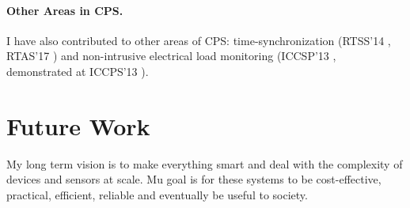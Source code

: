\documentclass[10pt]{article}
\begin{document}
\paragraph{Other Areas in CPS. }
I have also contributed to other areas of CPS:
time-synchronization (RTSS'14 \cite{buevich2013hardware}, RTAS'17 \cite{dongare2017pulsar}) and non-intrusive electrical load
monitoring (ICCSP'13 \cite{rajagopal2013magnetic}, demonstrated at ICCPS'13 \cite{rajagopal2013demo}).


\section{Future Work}
My long term vision is to make everything smart and deal with the complexity of devices and sensors at scale.  Mu goal is for these systems to be cost-effective, practical, efficient, reliable and eventually be useful to society. %
\end{document}
